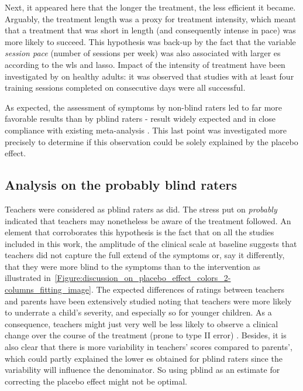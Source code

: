 Next, it appeared here that the longer the treatment, the less efficient it became. Arguably, the treatment length was a
proxy for treatment intensity, which meant that a treatment that was short in length (and consequently intense in pace)
was more likely to succeed. This hypothesis was back-up by the fact that the variable \emph{session pace} (number of
sessions per week) was also associated with larger \gls{es} according to the \gls{wls} and \gls{lasso}. Impact of the
intensity of treatment have been investigated by \citep{Rogala2016} on healthy adults: it was observed that studies with
at least four training sessions completed on consecutive days were all successful. 

As expected, the assessment of symptoms by non-blind raters led to far more favorable results than by \gls{pblind} raters -
result widely expected and in close compliance with existing meta-analysis \citep{Cortese2016, Micoulaud2014}. This last point
was investigated more precisely to determine if this observation could be solely explained by the placebo effect. 

\subsection{Analysis on the probably blind raters}

Teachers were considered as \gls{pblind} raters as \citeauthor{Cortese2016,Micoulaud2014} did. 
The stress put on \emph{probably} indicated that teachers may nonetheless be aware of the treatment followed. 
An element that corroborates this hypothesis is the fact that on all the studies included in this work, the amplitude 
of the clinical scale at baseline suggests that teachers did not capture the full extend of the symptoms or, say it differently, 
that they were more blind to the symptoms than to the intervention as illustrated 
in~\ref{Figure:discussion_on_placebo_effect_colors_2-columns_fitting_image}. The expected differences of ratings between 
teachers and parents have been extensively studied \citep{Sollie2013, Narad2015, Minder2018} noting that teachers were more 
likely to underrate a child's severity, and especially so for younger children. As a consequence, teachers might just very 
well be less likely to observe a clinical change over the course of the treatment (prone to type II error) 
\citep{Sollie2013, Narad2015, Minder2018}. Besides, it is also clear that there is more variability in teachers' scores compared 
to parents', which could partly explained the lower \gls{es} obtained for \gls{pblind} raters since the variability will influence 
the denominator. So using \gls{pblind} as an estimate for correcting the placebo effect might not be optimal.


